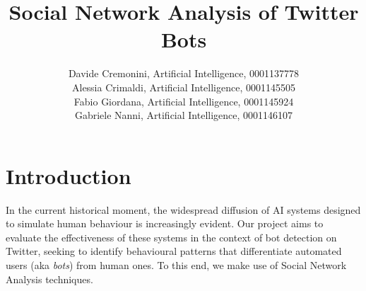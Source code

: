 \documentclass[12pt, a4paper]{article}
\author{Davide Cremonini, Artificial Intelligence, 0001137778
\\Alessia Crimaldi, Artificial Intelligence, 0001145505
\\Fabio Giordana, Artificial Intelligence, 0001145924
\\Gabriele Nanni, Artificial Intelligence, 0001146107}
\date{}
\title{Social Network Analysis of Twitter Bots}
\begin{document}
\maketitle










\section{Introduction} \label{introduction}
	In the current historical moment, the widespread diffusion of AI systems designed to simulate human behaviour is increasingly evident. Our project aims to evaluate the effectiveness of these systems in the context of bot detection on Twitter, seeking to identify behavioural patterns that differentiate automated users (aka \textit{bots}) from human ones. To this end, we make use of Social Network Analysis techniques.
\end{document}
